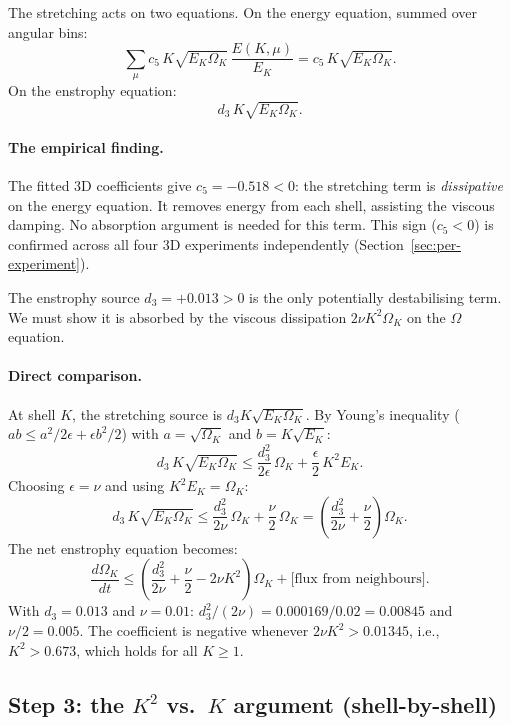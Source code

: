 \documentclass[11pt,a4paper]{article}
\theoremstyle{remark}
\begin{document}
The stretching acts on two equations.  On the energy equation, summed over angular bins:
\[
  \sum_\mu c_5\, K\sqrt{E_K\Omega_K}\, \frac{E(K,\mu)}{E_K} = c_5\, K\sqrt{E_K\Omega_K}.
\]
On the enstrophy equation:
\[
  d_3\, K\sqrt{E_K\Omega_K}.
\]

\paragraph{The empirical finding.}  The fitted 3D coefficients give $c_5 = -0.518 < 0$: the stretching term is \emph{dissipative} on the energy equation.  It removes energy from each shell, assisting the viscous damping.  No absorption argument is needed for this term.  This sign ($c_5 < 0$) is confirmed across all four 3D experiments independently (Section~\ref{sec:per-experiment}).

The enstrophy source $d_3 = +0.013 > 0$ is the only potentially destabilising term.  We must show it is absorbed by the viscous dissipation $2\nu K^2 \Omega_K$ on the $\Omega$ equation.

\paragraph{Direct comparison.}  At shell $K$, the stretching source is $d_3 K\sqrt{E_K \Omega_K}$.  By Young's inequality ($ab \leq a^2/2\epsilon + \epsilon b^2/2$) with $a = \sqrt{\Omega_K}$ and $b = K\sqrt{E_K}$:
\begin{equation}\label{eq:young}
  d_3\, K\sqrt{E_K\Omega_K} \leq \frac{d_3^2}{2\epsilon}\, \Omega_K + \frac{\epsilon}{2}\, K^2 E_K.
\end{equation}
Choosing $\epsilon = \nu$ and using $K^2 E_K = \Omega_K$:
\[
  d_3\, K\sqrt{E_K\Omega_K} \leq \frac{d_3^2}{2\nu}\, \Omega_K + \frac{\nu}{2}\, \Omega_K = \left(\frac{d_3^2}{2\nu} + \frac{\nu}{2}\right) \Omega_K.
\]
The net enstrophy equation becomes:
\[
  \frac{d\Omega_K}{dt} \leq \left(\frac{d_3^2}{2\nu} + \frac{\nu}{2} - 2\nu K^2\right) \Omega_K + \bigl[\text{flux from neighbours}\bigr].
\]
With $d_3 = 0.013$ and $\nu = 0.01$: $d_3^2/(2\nu) = 0.000169/0.02 = 0.00845$ and $\nu/2 = 0.005$.  The coefficient is negative whenever $2\nu K^2 > 0.01345$, i.e., $K^2 > 0.673$, which holds for all $K \geq 1$.

\subsection{Step 3: the $K^2$ vs.\ $K$ argument (shell-by-shell)}
\end{document}
